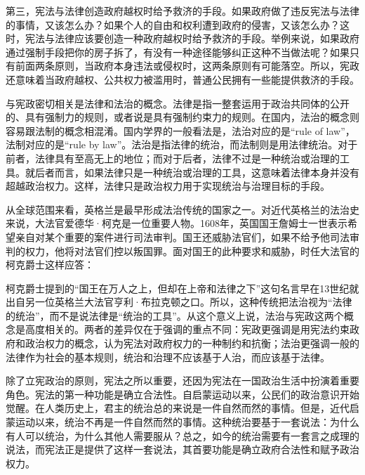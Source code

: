 第三，宪法与法律创造政府越权时给予救济的手段。如果政府做了违反宪法与法律的事情，又该怎么办？如果个人的自由和权利遭到政府的侵害，又该怎么办？这时，宪法与法律应该要创造一种政府越权时给予救济的手段。举例来说，如果政府通过强制手段把你的房子拆了，有没有一种途径能够纠正这种不当做法呢？如果只有前面两条原则，当政府本身违法或侵权时，这两条原则有可能落空。所以，宪政还意味着当政府越权、公共权力被滥用时，普通公民拥有一些能提供救济的手段。

与宪政密切相关是法律和法治的概念。法律是指一整套运用于政治共同体的公开的、具有强制力的规则，或者说是具有强制约束力的规则。在国内，法治的概念则容易跟法制的概念相混淆。国内学界的一般看法是，法治对应的是“rule of law”，法制对应的是“rule by law”。法治是指法律的统治，而法制则是用法律统治。对于前者，法律具有至高无上的地位；而对于后者，法律不过是一种统治或治理的工具。就后者而言，如果法律只是一种统治或治理的工具，这意味着法律本身并没有超越政治权力。这样，法律只是政治权力用于实现统治与治理目标的手段。

从全球范围来看，英格兰是最早形成法治传统的国家之一。对近代英格兰的法治史来说，大法官爱德华·柯克是一位重要人物。1608年，英国国王詹姆士一世表示希望亲自对某个重要的案件进行司法审判。国王还威胁法官们，如果不给予他司法审判的权力，他将对法官们控以叛国罪。面对国王的此种要求和威胁，时任大法官的柯克爵士这样应答：


柯克爵士提到的“国王在万人之上，但却在上帝和法律之下”这句名言早在13世纪就出自另一位英格兰大法官亨利·布拉克顿之口。所以，这种传统把法治视为“法律的统治”，而不是说法律是“统治的工具”。从这个意义上说，法治与宪政这两个概念是高度相关的。两者的差异仅在于强调的重点不同：宪政更强调是用宪法约束政府和政治权力的概念，认为宪法对政府权力的一种制约和抗衡；法治更强调一般的法律作为社会的基本规则，统治和治理不应该基于人治，而应该基于法律。

除了立宪政治的原则，宪法之所以重要，还因为宪法在一国政治生活中扮演着重要角色。宪法的第一种功能是确立合法性。自启蒙运动以来，公民们的政治意识开始觉醒。在人类历史上，君主的统治总的来说是一件自然而然的事情。但是，近代启蒙运动以来，统治不再是一件自然而然的事情。这种统治要基于一套说法：为什么有人可以统治，为什么其他人需要服从？总之，如今的统治需要有一套言之成理的说法，而宪法正是提供了这样一套说法，其首要功能是确立政府合法性和赋予政治权力。

